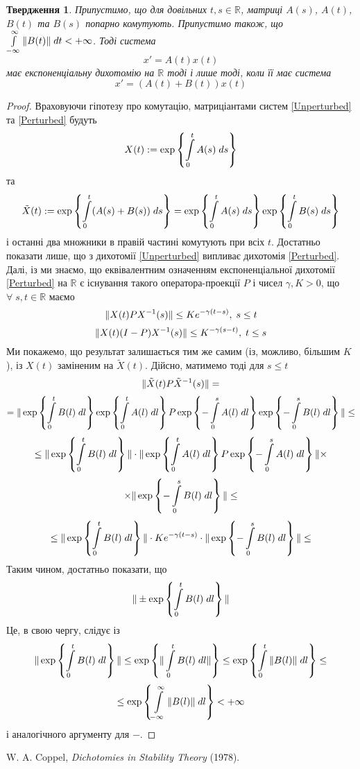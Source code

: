 \documentclass[14pt]{extarticle} %
\title{}
\author{Олексій Леонтьєв}
\let\oldforall\forall
\renewcommand{\forall}{\oldforall\;}
\newtheorem*{proposition}{Твердження}
\begin{document}
\maketitle
\begin{proposition}Припустимо, що для довільних $t,s\in\mathbb{R}$, матриці $A(s)$, $A(t)$, $B(t)$ та $B(s)$ попарно комутують.
	Припустимо також, що $\int_{-\infty}^\infty\mynorm{B(t)}\;dt<+\infty$. Тоді система 
	\begin{equation}\label{Unperturbed}
	x'=A(t)x(t)
	\end{equation}
	має експоненціальну дихотомію на $\mathbb{R}$ тоді і лише тоді, коли її має система
	\begin{equation}\label{Perturbed}
	x'=(A(t)+B(t))x(t)
	\end{equation}
\end{proposition}
\begin{proof}Враховуючи гіпотезу про комутацію, матриціантами систем \eqref{Unperturbed} та \eqref{Perturbed} будуть
	\[X(t):=\exp\mycbra{\int_0^tA(s)\;ds}\]
	та \[\tilde{X}(t):=\exp\mycbra{\int_0^t(A(s)+B(s))\;ds}=\exp\mycbra{\int_0^tA(s)\;ds}\exp\mycbra{\int_0^tB(s)\;ds}\]
	і останні два множники в правій частині комутують при всіх $t$.
	Достатньо показати лише, що з дихотомії \eqref{Unperturbed} випливає дихотомія \eqref{Perturbed}.
	Далі, із \cite{coppel} ми знаємо, що еквівалентним означенням експоненціальної дихотомії \eqref{Perturbed}
	на $\mathbb{R}$ є існування
	такого оператора-проекції $P$ і чисел $\gamma,K>0$, що $\forall s,t\in\mathbb{R}$ маємо
	\[\|X(t)PX^{-1}(s)\|\leq Ke^{-\gamma(t-s)},\;s\leq t\]
	\[\|X(t)(I-P)X^{-1}(s)\|\leq K^{-\gamma(s-t)},\;t\leq s\]
	Ми покажемо, що результат залишається тим же самим (із, можливо, більшим $K$), із $X(t)$ заміненим на $\tilde{X}(t)$.
	Дійсно, матимемо тоді для $s\leq t$
	\[\|\tilde{X}(t)P\tilde{X}^{-1}(s)\|=\]
	\[=\mynorm{\exp\mycbra{\int_0^tB(l)\;dl}\exp\mycbra{\int_0^tA(l)\;dl}P\exp\mycbra{-\int_0^sA(l)\;dl}
	\exp\mycbra{-\int_0^sB(l)\;dl}}\leq\]
	\[\leq\mynorm{\exp\mycbra{\int_0^tB(l)\;dl}}\cdot\mynorm{\exp\mycbra{\int_0^tA(l)\;dl}P\exp\mycbra{-\int_0^sA(l)\;dl}}\times
	\]\[\times\mynorm{\exp\mycbra{-\int_0^sB(l)\;dl}}\leq\]
	\[\leq\mynorm{\exp\mycbra{\int_0^tB(l)\;dl}}\cdot Ke^{-\gamma(t-s)}\cdot
	\mynorm{\exp\mycbra{-\int_0^sB(l)\;dl}}\leq\]
	Таким чином, достатньо показати, що
	\[\mynorm{\pm\exp\mycbra{\int_0^tB(l)\;dl}}\]
	Це, в свою чергу, слідує із
	\[\mynorm{\exp\mycbra{\int_0^tB(l)\;dl}}\leq\exp\mycbra{\mynorm{\int_0^tB(l)\;dl}}\leq\exp\mycbra{\int_0^t\mynorm{B(l)}\;dl
	}\leq\]
	\[\leq\exp\mycbra{\int_{-\infty}^{\infty}\mynorm{B(l)}\;dl}<+\infty\]
	і аналогічного аргументу для $-$.
\end{proof}
\begin{thebibliography}{9}
	W. A. Coppel, {\em Dichotomies in Stability Theory} (1978).
\end{thebibliography}
\end{document}
